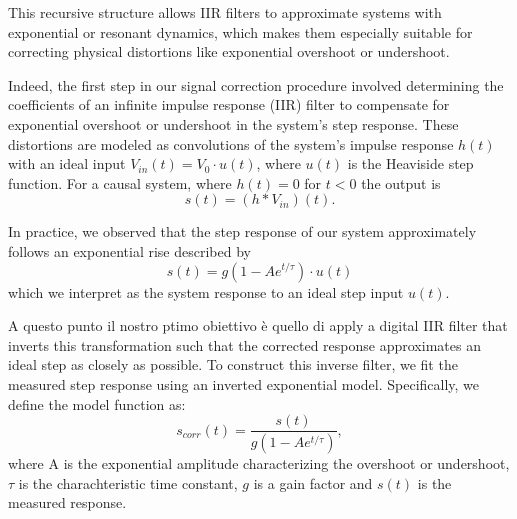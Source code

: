 This recursive structure allows IIR filters to approximate systems with exponential or resonant dynamics, which makes them especially suitable for correcting physical distortions like exponential overshoot or undershoot.

Indeed, the first step in our signal correction procedure involved determining the coefficients of an infinite impulse response (IIR) filter to compensate for exponential overshoot or undershoot in the system’s step response.
These distortions are modeled as convolutions of the system's impulse response $h(t)$ with an ideal input $V_{in}(t) = V_0\cdot u(t)$, where $u(t)$ is the Heaviside step function.
For a causal system, where $h(t)=0$ for $t<0$ the output is 
\begin{equation}
    s(t) = (h \ast V_{in})(t).
\end{equation}

In practice, we observed that the step response of our system approximately follows an exponential rise described by
\begin{equation}
    s(t) = g(1-Ae^{t/\tau})\cdot u(t)
\end{equation}
which we interpret as the system response to an ideal step input $u(t)$. 

A questo punto il nostro ptimo obiettivo è quello di apply a digital IIR filter that inverts this transformation such that the corrected response approximates an ideal step as closely as possible.
To construct this inverse filter, we fit the measured step response using an inverted exponential model. Specifically, we define the model function as:
\begin{equation}\label{eq:inverse}
    s_{corr}(t) = \frac{s(t)}{g(1-Ae^{t/\tau})},
\end{equation}
where A is the exponential amplitude characterizing the overshoot or undershoot, $\tau$ is the charachteristic time constant, $g$ is a gain factor and $s(t)$ is the measured response.

